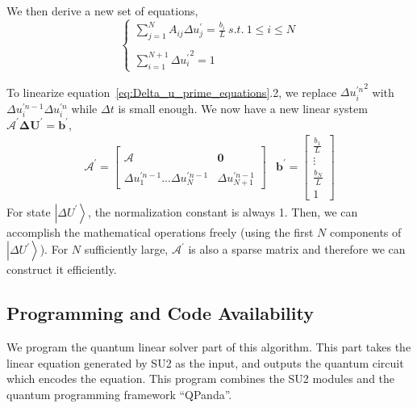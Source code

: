 \documentclass[%
 reprint,
 amsmath,amssymb,
pra,
]{revtex4-1}
\begin{document}
We then derive a new set of equations,
\begin{equation}\label{eq:Delta_u_prime_equations}
\left\{
\begin{array}{l}
  \sum_{j=1}^{N}A_{ij}\Delta u_j^{\prime} = \frac{b_i}{L} \ s.t. \ 1\leq i \leq N\\
  \\
  \sum_{i=1}^{N + 1}{\Delta u_i^{\prime}}^2 = 1
\end{array}
\right.
\end{equation}

To linearize equation~\ref{eq:Delta_u_prime_equations}.2, we replace ${\Delta u^{\prime n}_i}^2$ with $\Delta u^{\prime n - 1}_i \Delta u^{\prime n}_i$ while $\Delta t$ is small enough. We now have a new linear system $\mathcal{A^{\prime}} \bm{\Delta U^{\prime}} = \bm{b^{\prime}}$,
\begin{equation}
\begin{array}{cc}
\mathcal{A^{\prime}} = \left[
\begin{array}{cc}
  &\\
  \mathcal{A} & \bm{0}\\
  &\\
  \Delta u^{\prime n - 1}_1...\Delta u^{\prime n - 1}_N&\Delta u^{\prime n - 1}_{N+1}
\end{array}
\right]
&
\bm{b^{\prime}} = \left[
\begin{array}{c}
  \frac{b_1}{L}\\
  \vdots\\
  \frac{b_N}{L}\\
  1
\end{array}
\right]
\end{array}
\end{equation}
For state $\left|\Delta U^{\prime}\right\rangle$, the normalization constant is always 1. Then, we can accomplish the mathematical operations freely (using the first $N$ components of $\left|\Delta U^{\prime}\right\rangle$). For $N$ sufficiently large, $\mathcal{A^{\prime}}$ is also a sparse matrix and therefore we can construct it efficiently.

\subsection{Programming and Code Availability}
We program the quantum linear solver part of this algorithm. This part takes the linear equation generated by SU2 as the input, and outputs the quantum circuit which encodes the equation. This program combines the SU2 modules and the quantum programming framework ``QPanda''.
\end{document}
